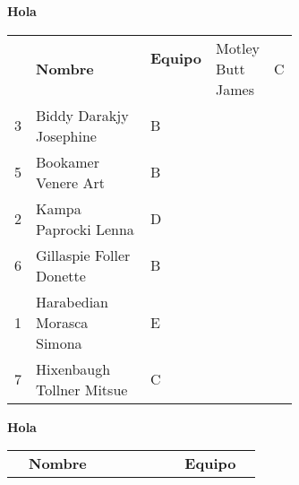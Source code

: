 \begin{minipage}{0.95\linewidth}
\begin{flushleft}
\textbf{
Hola
}
\end{flushleft}
\begin{tabular}{cp{0.63\linewidth}l}
\hline
& \textbf{Nombre} & \textbf{Equipo} \  & Motley Butt James & C \\ 
3 & Biddy Darakjy Josephine & B \\ 
5 & Bookamer Venere Art & B \\ 
2 & Kampa Paprocki Lenna & D \\ 
6 & Gillaspie Foller Donette & B \\ 
1 & Harabedian Morasca Simona & E \\ 
7 & Hixenbaugh Tollner Mitsue & C \\ 
\end{tabular}
\end{minipage}
\begin{minipage}{0.95\linewidth}
\begin{flushleft}
\textbf{
Hola
}
\end{flushleft}
\begin{tabular}{cp{0.63\linewidth}l}
\hline
& \textbf{Nombre} & \textbf{Equipo} \ \hline
\end{tabular}
\end{minipage}
